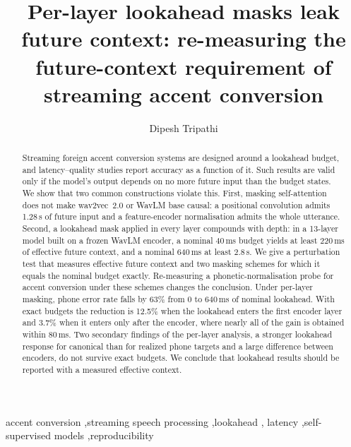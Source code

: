 \documentclass[preprint,12pt,authoryear]{elsarticle}
\begin{document}
\begin{frontmatter}

\title{Per-layer lookahead masks leak future context: re-measuring the
future-context requirement of streaming accent conversion}

\author{Dipesh Tripathi}

\begin{abstract}
Streaming foreign accent conversion systems are designed around a lookahead
budget, and latency--quality studies report accuracy as a function of it. Such results are valid only if the
model's output depends on no more future input than the budget states. We
show that two common constructions violate this. First, masking
self-attention does not make wav2vec~2.0 or WavLM base causal: a positional
convolution admits 1.28\,s of future input and a feature-encoder
normalisation admits the whole utterance. Second, a lookahead mask applied in
every layer compounds with depth: in a 13-layer model built on a frozen WavLM
encoder, a nominal 40\,ms budget yields at least 220\,ms of effective future
context, and a nominal 640\,ms at least 2.8\,s. We give a perturbation test
that measures effective future context and two masking schemes for which it
equals the nominal budget exactly. Re-measuring a phonetic-normalisation
probe for accent conversion under these schemes changes the conclusion. Under per-layer masking, phone error rate falls by 63\% from 0
to 640\,ms of nominal lookahead. With exact budgets the reduction is 12.5\%
when the lookahead enters the first encoder layer and 3.7\% when it enters
only after the encoder, where nearly all of the gain is obtained within
80\,ms. Two secondary findings of the per-layer analysis, a stronger
lookahead response for canonical than for realized phone targets and a large
difference between encoders, do not survive exact budgets. We conclude that
lookahead results should be reported with a measured effective context.
\end{abstract}

\begin{keyword}
accent conversion \sep streaming speech processing \sep lookahead \sep
latency \sep self-supervised models \sep reproducibility
\end{keyword}

\end{frontmatter}
\end{document}
